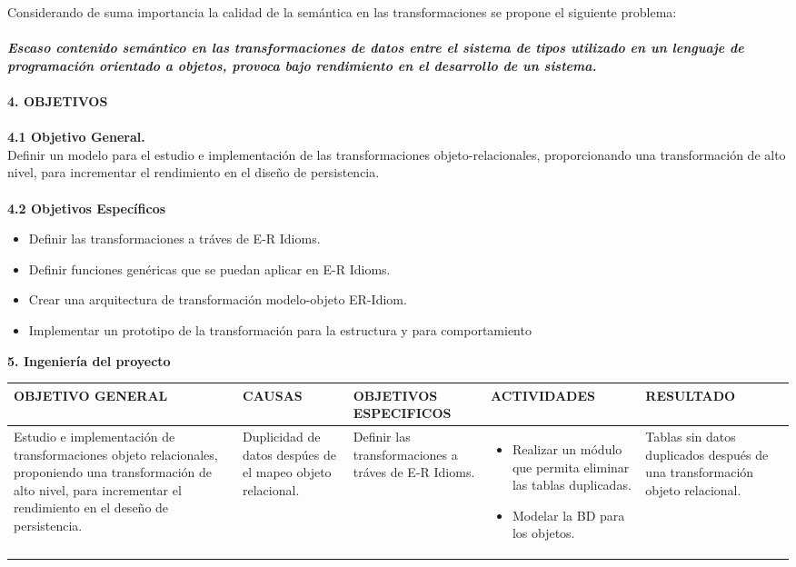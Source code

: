 \documentclass[11pt]{article}
\begin{document}
\begin{flushleft}
\textrm{ Considerando de  suma importancia la calidad de la semántica en las transformaciones se propone el siguiente problema:
\\
\\ \textbf{\textit{Escaso contenido semántico en las transformaciones de datos entre el sistema de tipos utilizado en un lenguaje de programación orientado a objetos, provoca bajo rendimiento en el desarrollo de un sistema.}}
}
\\
\\ \textbf{4. OBJETIVOS}\\
\\ \textbf{4.1 Objetivo General.}
\\
\textrm{Definir un modelo para el estudio e implementación de las transformaciones objeto-relacionales, proporcionando una transformación de alto nivel, para incrementar el rendimiento en el diseño de persistencia.} \\
\\ \textbf{4.2 Objetivos Específicos}
\begin{itemize}
	\item Definir las transformaciones a tráves de E-R Idioms.
	\item Definir funciones genéricas que se puedan aplicar en E-R Idioms.
	\item Crear una arquitectura de transformación modelo-objeto ER-Idiom.
	\item Implementar un prototipo de la transformación para la estructura y para comportamiento	
\end{itemize}
\textbf{5. Ingeniería del proyecto}\\
 \begin{longtable}{|p{2.8cm}| p{2.8cm}| p{2.8cm}| p{2.8cm}| p{2.8cm}|}
    \hline
	OBJETIVO GENERAL & CAUSAS & OBJETIVOS ESPECIFICOS & ACTIVIDADES & RESULTADO \\ \hline
	\multirow {3}{2.8cm}{Estudio e implementación de transformaciones objeto relacionales, proponiendo una transformación de alto nivel, para incrementar el rendimiento en el deseño de persistencia.}
    & {Duplicidad de datos despúes de el mapeo objeto relacional.} & Definir las transformaciones a tráves de E-R Idioms. & 
	\parbox {2.8cm}{
	\begin{itemize}
		\item Realizar un módulo que permita eliminar las tablas duplicadas.
		\item Modelar la BD para los objetos.
	\end{itemize}}
	& Tablas sin datos duplicados después de una transformación objeto relacional.\\ \hline

\end{longtable}
\end{flushleft}
\end{document}

